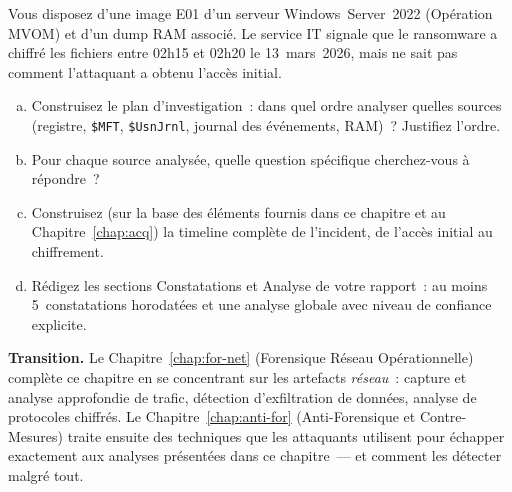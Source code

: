 \begin{boxexo}[title={\ding{45}\quad Exercice~14.3 --- Timeline complète \niveauexpert}]
Vous disposez d'une image E01 d'un serveur Windows~Server~2022
(Opération MVOM) et d'un dump RAM associé. Le service IT signale
que le ransomware a chiffré les fichiers entre 02h15 et 02h20
le 13~mars~2026, mais ne sait pas comment l'attaquant a obtenu
l'accès initial.

\begin{enumerate}[(a)]
    \item Construisez le plan d'investigation~: dans quel ordre
          analyser quelles sources (registre, \texttt{\$MFT},
          \texttt{\$UsnJrnl}, journal des événements, RAM)~? Justifiez
          l'ordre.
    \item Pour chaque source analysée, quelle question spécifique
          cherchez-vous à répondre~?
    \item Construisez (sur la base des éléments fournis dans ce
          chapitre et au Chapitre~\ref{chap:acq}) la timeline complète
          de l'incident, de l'accès initial au chiffrement.
    \item Rédigez les sections Constatations et Analyse de votre
          rapport~: au moins 5~constatations horodatées et une
          analyse globale avec niveau de confiance explicite.
\end{enumerate}
\end{boxexo}

\bigskip

\begin{boxinfo}
\textbf{Transition.} Le Chapitre~\ref{chap:for-net} (Forensique Réseau
Opérationnelle) complète ce chapitre en se concentrant sur les artefacts
\emph{réseau}~: capture et analyse approfondie de trafic, détection
d'exfiltration de données, analyse de protocoles chiffrés. Le
Chapitre~\ref{chap:anti-for} (Anti-Forensique et Contre-Mesures)
traite ensuite des techniques que les attaquants utilisent pour
échapper exactement aux analyses présentées dans ce chapitre~--- et
comment les détecter malgré tout.
\end{boxinfo}
